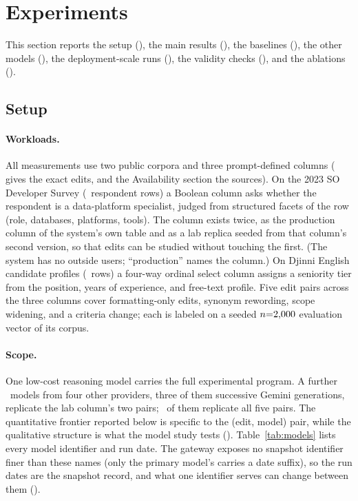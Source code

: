 \keepheading
\section{Experiments}
\label{sec:experiments}

This section reports the setup (), the main
results (), the baselines
(), the other models
(), the deployment-scale runs
(), the validity checks
(), and the ablations
().


\keepheading
\subsection{Setup}
\label{sec:exp-setup}

\keeprunin
\paragraph{Workloads.} All measurements use two public corpora and
three prompt-defined columns ( gives the exact
edits, and the Availability section the sources). On the 2023 SO
Developer Survey (\corpusSO\ respondent rows) a Boolean
column asks whether the respondent is a data-platform specialist, judged from
structured facets of the row (role, databases, platforms, tools). The
column exists twice, as the production column of the system's own table
and as a lab replica seeded from that column's second version, so that
edits can be studied without touching the first. (The system has no
outside users; ``production'' names the column.) On Djinni English
candidate profiles (\corpusDjinni\ rows) a four-way ordinal select
column assigns a seniority tier from the position, years of experience,
and free-text profile. Five edit pairs across the three columns cover
formatting-only edits, synonym rewording, scope widening, and a
criteria change; each is labeled on a seeded $n{=}2{,}000$ evaluation
vector of its corpus.

\keeprunin
\paragraph{Scope.} One
low-cost reasoning model carries the full experimental program.
A further \famCountWord\ models from four other providers, three of
them successive Gemini generations, replicate the lab
column's two pairs\ifnum{}\relax; \famFivePairFamiliesWord\
of them replicate all five pairs\fi. The quantitative frontier reported below is
specific to the (edit, model) pair, while the qualitative structure is
what the model study tests (\secref{sec:limits}). Table~\ref{tab:models}
lists every model identifier and run date. The gateway exposes no
snapshot identifier finer than these names (only the primary model's
carries a date suffix), so the run dates are the snapshot record, and
what one identifier serves can change between them
().

